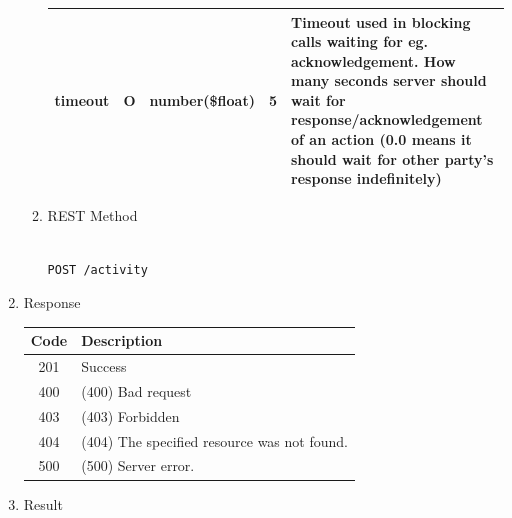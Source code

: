 \begin{enumerate}
\begin{enumerate}
\begin{table}[H]
\begin{center}
\begin{tabular}{|p{3cm}|l|p{3cm}|p{3cm}|p{4cm}|}
timeout					& O	& 	number(\$float)		&	5							&	Timeout used in blocking calls waiting for eg. acknowledgement. 
																						How many seconds server should wait for response/acknowledgement of an action 
																						(0.0 means it should wait for other party's response indefinitely) \\ 
\hline


\end{tabular}
\end{center}
\end{table}


\item REST Method

\begin{tcolorbox}[boxrule=0pt, frame empty]
\begin{verbatim} 

POST /activity

\end{verbatim}
\end{tcolorbox}

\end{enumerate}

\item Response

\begin{table}[H]
\footnotesize

\begin{center}
\begin{tabular}{|c|l|} 
\hline
\rowcolor{lightgray}	Code 		& 	Description \\
\hline
201	 		&	Success \\
\hline
400			&	(400) Bad request \\
\hline
403			&	(403) Forbidden	\\
\hline
404			&	(404) The specified resource was not found. \\
\hline
500			&	(500) Server error. \\
\hline
\end{tabular}
\end{center}
\end{table}

\item Result

\begin{tcolorbox}[boxrule=0pt, frame empty]
\begin{verbatim}


\end{verbatim}
\end{tcolorbox}
\end{enumerate}
